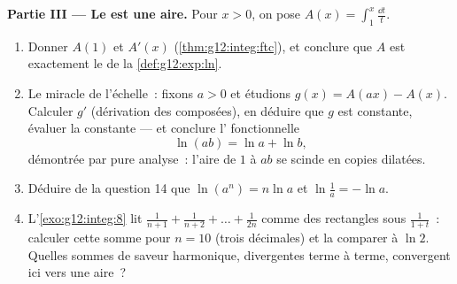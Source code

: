\begin{problem}
\medskip
\noindent\textbf{Partie III --- Le  est une aire.}
Pour $x > 0$, on pose
$A(x) = \displaystyle\int_1^x \frac{\dd t}{t}$.
\begin{enumerate}[resume]
  \item Donner $A(1)$ et $A'(x)$ (\cref{thm:g12:integ:ftc}), et
        conclure que $A$ est exactement le  de la
        \cref{def:g12:exp:ln}.
  \item Le miracle de l'échelle~: fixons $a > 0$ et étudions
        $g(x) = A(ax) - A(x)$. Calculer $g'$ (dérivation des
        composées), en déduire que $g$ est constante, évaluer la
        constante --- et conclure l' fonctionnelle
        \[
        \ln(ab) = \ln a + \ln b ,
        \]
        démontrée par pure analyse~: l'aire de $1$ à $ab$ se scinde
        en copies dilatées.
  \item Déduire de la question 14 que $\ln(a^n) = n\ln a$ et
        $\ln\frac1a = -\ln a$.
  \item L'\cref{exo:g12:integ:8} lit
        $\frac{1}{n+1} + \frac{1}{n+2} + \dots + \frac{1}{2n}$
        comme des rectangles sous $\frac{1}{1 + t}$~: calculer cette
        somme pour $n = 10$ (trois décimales) et la comparer à
        $\ln 2$. Quelles sommes de saveur harmonique, divergentes
        terme à terme, convergent ici vers une aire~?
\end{enumerate}


\end{problem}
